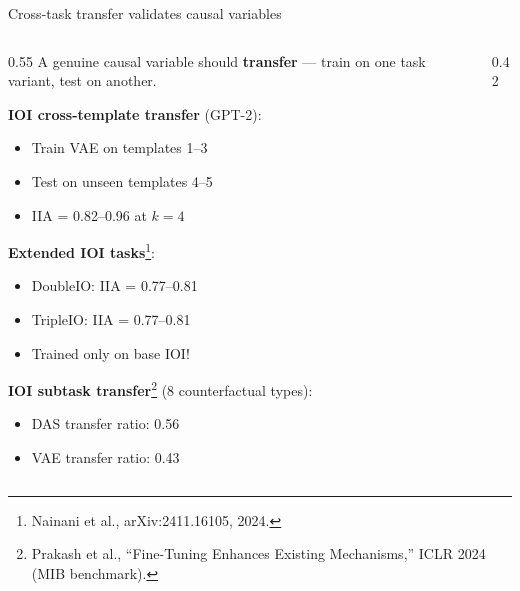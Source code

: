 \documentclass[aspectratio=169,11pt]{beamer}
\begin{document}
\begin{frame}{Cross-task transfer validates causal variables}

\begin{columns}[T]
\begin{column}{0.55\textwidth}
{\small A genuine causal variable should \textbf{transfer} --- train on one task variant, test on another.}

\vspace{0.3em}
{\small \textbf{IOI cross-template transfer} (GPT-2):}
\begin{itemize}
  \item {\small Train VAE on templates 1--3}
  \item {\small Test on unseen templates 4--5}
  \item {\small IIA = 0.82--0.96 at $k = 4$}
\end{itemize}

\vspace{0.3em}
{\small \textbf{Extended IOI tasks}\footnote{\tiny Nainani et al., arXiv:2411.16105, 2024.}:}
\begin{itemize}
  \item {\small DoubleIO: IIA = 0.77--0.81}
  \item {\small TripleIO: IIA = 0.77--0.81}
  \item {\small Trained only on base IOI!}
\end{itemize}

\vspace{0.3em}
{\small \textbf{IOI subtask transfer}\footnote{\tiny Prakash et al., ``Fine-Tuning Enhances Existing Mechanisms,'' ICLR 2024 (MIB benchmark).} (8 counterfactual types):}
\begin{itemize}
  \item {\small DAS transfer ratio: 0.56}
  \item {\small VAE transfer ratio: 0.43}
\end{itemize}
\end{column}
\begin{column}{0.42\textwidth}
\end{column}
\end{columns}
\end{frame}
\end{document}
